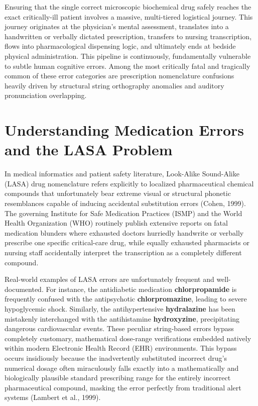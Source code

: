 \documentclass[12pt,a4paper]{report}
\begin{document}
Ensuring that the single correct microscopic biochemical drug safely reaches the exact critically-ill patient involves a massive, multi-tiered logistical journey. This journey originates at the physician's mental assessment, translates into a handwritten or verbally dictated prescription, transfers to nursing transcription, flows into pharmacological dispensing logic, and ultimately ends at bedside physical administration. This pipeline is continuously, fundamentally vulnerable to subtle human cognitive errors. Among the most critically fatal and tragically common of these error categories are prescription nomenclature confusions heavily driven by structural string orthography anomalies and auditory pronunciation overlapping.

\section{Understanding Medication Errors and the LASA Problem}
In medical informatics and patient safety literature, Look-Alike Sound-Alike (LASA) drug nomenclature refers explicitly to localized pharmaceutical chemical compounds that unfortunately bear extreme visual or structural phonetic resemblances capable of inducing accidental substitution errors (Cohen, 1999). The governing Institute for Safe Medication Practices (ISMP) and the World Health Organization (WHO) routinely publish extensive reports on fatal medication blunders where exhausted doctors hurriedly handwrite or verbally prescribe one specific critical-care drug, while equally exhausted pharmacists or nursing staff accidentally interpret the transcription as a completely different compound.

Real-world examples of LASA errors are unfortunately frequent and well-documented. For instance, the antidiabetic medication \textbf{chlorpropamide} is frequently confused with the antipsychotic \textbf{chlorpromazine}, leading to severe hypoglycemic shock. Similarly, the antihypertensive \textbf{hydralazine} has been mistakenly interchanged with the antihistamine \textbf{hydroxyzine}, precipitating dangerous cardiovascular events. These peculiar string-based errors bypass completely customary, mathematical dose-range verifications embedded natively within modern Electronic Health Record (EHR) environments. This bypass occurs insidiously because the inadvertently substituted incorrect drug's numerical dosage often miraculously falls exactly into a mathematically and biologically plausible standard prescribing range for the entirely incorrect pharmaceutical compound, masking the error perfectly from traditional alert systems (Lambert et al., 1999).
\end{document}
